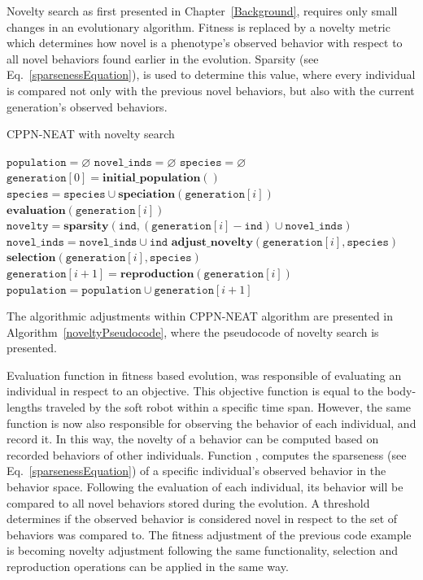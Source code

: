 Novelty search as first presented in Chapter~\ref{Background}, requires only small changes in an evolutionary algorithm. Fitness is replaced by a novelty metric which determines how novel is a phenotype's observed behavior with respect to all novel behaviors found earlier in the evolution. Sparsity (see Eq.~\ref{sparsenessEquation}), is used to determine this value, where every individual is compared not only with the previous novel behaviors, but also with the current generation's observed behaviors.



\begin{algorithm}[t!]
\caption{CPPN-NEAT with novelty search}
\label{noveltyPseudocode}
\begin{algorithmic}[1]
\STATE $\mathtt{population} = \varnothing$
\STATE $\mathtt{novel\_inds} = \varnothing$
\STATE $\mathtt{species} = \varnothing$
\STATE $\mathtt{generation}[0] = \mathbf{initial\_population}()$
\STATE $\mathtt{species} = \mathtt{species} \cup \mathbf{speciation}(\mathtt{generation}[i])$
\STATE $\mathbf{evaluation}(\mathtt{generation}[i])$
\STATE $\mathtt{novelty} = \mathbf{sparsity}(\mathtt{ind}, (\mathtt{generation}[i] - \mathtt{ind}) \cup \mathtt{novel\_inds})$
\STATE $\mathtt{novel\_inds} = \mathtt{novel\_inds} \cup \mathtt{ind}$
\ENDIF
\ENDFOR
\STATE $\mathbf{adjust\_novelty}(\mathtt{generation}[i], \mathtt{species})$
\STATE $\mathbf{selection}(\mathtt{generation}[i], \mathtt{species})$
\STATE $\mathtt{generation}[i+1] = \mathbf{reproduction}(\mathtt{generation}[i])$
\STATE $\mathtt{population} = \mathtt{population} \cup \mathtt{generation}[i+1]$
\ENDFOR
\end{algorithmic}
\end{algorithm}


The algorithmic adjustments within CPPN-NEAT algorithm are presented in Algorithm~\ref{noveltyPseudocode}, where the pseudocode of novelty search is presented.

Evaluation function in fitness based evolution, was responsible of evaluating an individual in respect to an objective. This objective function is equal to the body-lengths traveled by the soft robot within a specific time span. However, the same function is now also responsible for observing the behavior of each individual, and record it. In this way, the novelty of a behavior can be computed based on recorded behaviors of other individuals. Function , computes the sparseness (see Eq.~\ref{sparsenessEquation}) of a specific individual's observed behavior in the behavior space. Following the evaluation of each individual, its behavior will be compared to all novel behaviors stored during the evolution. A threshold determines if the observed behavior is considered novel in respect to the set of behaviors was compared to. The fitness adjustment of the previous code example is becoming novelty adjustment following the same functionality, selection and reproduction operations can be applied in the same way.


